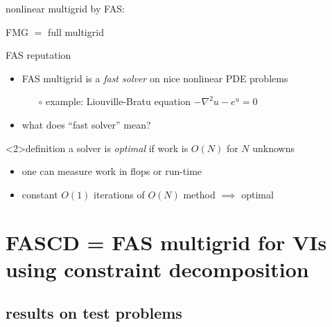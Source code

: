 \documentclass[svgnames,
               hyperref={colorlinks,citecolor=DeepPink4,linkcolor=FireBrick,urlcolor=Maroon},
               usepdftitle=false]  %
               {beamer}
\begin{document}
\begin{frame}{nonlinear multigrid by FAS: }
{\centering


FMG $=$ full multigrid

\vspace{6mm}
}
\end{frame}


\begin{frame}{FAS reputation}

\begin{itemize}
\item FAS multigrid is a \emph{fast solver} on nice nonlinear PDE problems
    \begin{itemize}
    \item[$\circ$] example: Liouville-Bratu equation $-\nabla^2 u - e^u = 0$
    \end{itemize}

\bigskip
\item<2> what does ``fast solver'' mean?
\end{itemize}

\begin{block}<2>{definition} a solver is \emph{optimal} if work is $O(N)$ for $N$ unknowns
\end{block}

\begin{itemize}
\item<2> one can measure work in flops or run-time
\item<2> constant $O(1)$ iterations of $O(N)$ method $\implies$ optimal
\end{itemize}
\end{frame}


\section{FASCD = FAS multigrid for VIs using constraint decomposition}

\subsection{results on test problems}
\end{document}
